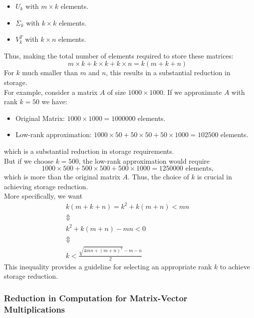     \begin{itemize}
        \item $U_k$ with $m \times k$ elements.
        \item $\Sigma_k$ with $k \times k$ elements.
        \item $V_k^T$ with $k \times n$ elements.
    \end{itemize}
    Thus, making the total number of elements required to store these matrices:
    \begin{displaymath}
        m \times k + k \times k + k \times n = k(m + k + n)
    \end{displaymath}
    For \(k\) much smaller than \(m\) and \(n\), this results in a substantial reduction in storage.\\
    For example, consider a matrix \(A\) of size \(1000 \times 1000\). If we approximate \(A\) with rank \(k = 50\) we have:
    \begin{itemize}
        \item Original Matrix: \(1000 \times 1000 = 1000000\) elements.
        \item Low-rank approximation: \(1000 \times 50 + 50 \times 50 + 50 \times 1000 = 102500\) elements.
    \end{itemize}
    which is a substantial reduction in storage requirements.\\
    But if we choose \(k = 500\), the low-rank approximation would require 
    \begin{displaymath}
        1000 \times 500 + 500 \times 500 + 500 \times 1000 = 1250000 \text{ elements,}
    \end{displaymath} which is more than the original matrix \(A\). Thus, the choice of \(k\) is crucial in achieving storage reduction.\\
    More specifically, we want
    \begin{gather*}
        k(m+k+n) = k^2 + k(m+n) < mn \\
        \Updownarrow \\
        k^2 + k(m+n) - mn < 0 \\
        \Updownarrow \\
        k < \frac{\sqrt{4mn + (m+n)^2} - m - n}{2}
    \end{gather*}
    This inequality provides a guideline for selecting an appropriate rank \(k\) to achieve storage reduction.
    
    \subsubsection{Reduction in Computation for Matrix-Vector Multiplications}
    
